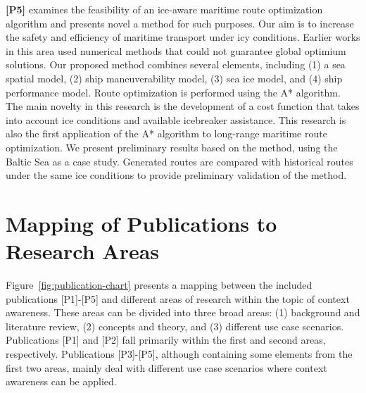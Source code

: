\textbf{[P5]} examines the feasibility of an ice-aware maritime route optimization algorithm and presents novel a method for such purposes. Our aim is to increase the safety and efficiency of maritime transport under icy conditions. Earlier works in this area used numerical methods that could not guarantee global optimium solutions. Our proposed method combines several elements, including (1) a sea spatial model, (2) ship maneuverability model, (3) sea ice model, and (4) ship performance model. Route optimization is performed using the A* algorithm. The main novelty in this research is the development of a cost function that takes into account ice conditions and available icebreaker assistance. This research is also the first application of the A* algorithm to long-range maritime route optimization. We present preliminary results based on the method, using the Baltic Sea as a case study. Generated routes are compared with historical routes under the same ice conditions to provide preliminary validation of the method.

\section{Mapping of Publications to Research Areas}
\label{sec:relating_to_research}

Figure~\ref{fig:publication-chart} presents a mapping between the included publications [P1]-[P5] and different areas of research within the topic of context awareness. These areas can be divided into three broad areas: (1) background and literature review, (2) concepts and theory, and (3) different use case scenarios. Publications [P1] and [P2] fall primarily within the first and second areas, respectively. Publications [P3]-[P5], although containing some elements from the first two areas, mainly deal with different use case scenarios where context awareness can be applied.


